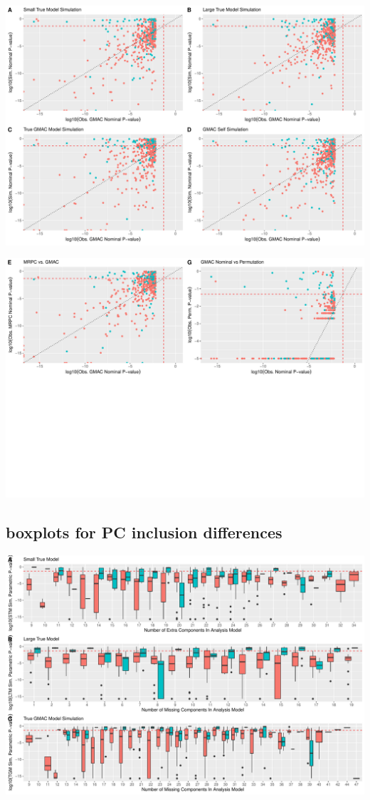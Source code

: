 \documentclass[
]{article}
\begin{document}
\includegraphics{GMACwriteup_files/figure-latex/unnamed-chunk-9-1.pdf}

\includegraphics{GMACwriteup_files/figure-latex/unnamed-chunk-10-1.pdf}

\hypertarget{boxplots-for-pc-inclusion-differences}{%
\subsection{boxplots for PC inclusion
differences}\label{boxplots-for-pc-inclusion-differences}}

\includegraphics{GMACwriteup_files/figure-latex/unnamed-chunk-11-1.pdf}
\end{document}

